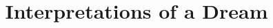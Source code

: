 \documentclass[11pt]{article}
\begin{document}
\ttfamily
\title{Interpretations of a Dream}
\maketitle
\end{document}
